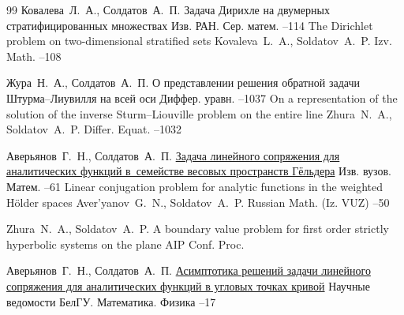 \begin{thebibliography}{99}
\by Ковалева~Л.~А., Солдатов~А.~П.
\paper Задача Дирихле на двумерных стратифицированных множествах
\jour Изв. РАН. Сер. матем.
--114
\transl
\paper The Dirichlet problem on two-dimensional stratified sets
\by \linebreak Kovaleva~L.~A., Soldatov~A.~P.
\jour Izv. Math.
--108

\by Жура~Н.~А., Солдатов~А.~П.
\paper О представлении решения обратной задачи Штурма–Лиувилля на всей оси
\jour Диффер. уравн.
--1037 
\transl
\paper On a representation of the solution of the inverse Sturm–Liouville problem on the entire line
\by Zhura~N.~A., Soldatov~A.~P.
\jour Differ. Equat.
--1032

\by Аверьянов~Г.~Н., Солдатов~А.~П.
\paper \href{http://mi.mathnet.ru/ivm9035}{Задача линейного сопряжения для аналитических функций в~семействе весовых пространств Гёльдера}
\jour Изв. вузов. Матем.
--61
\transl
\paper Linear conjugation problem for analytic functions in the weighted Hölder spaces
\by Aver'yanov~G.~N., Soldatov~A.~P.
\jour Russian Math. (Iz. VUZ)
--50

\by Zhura~N.~A., Soldatov~A.~P.
\paper A boundary value problem for first order strictly hyperbolic systems on the plane
\jour AIP Conf. Proc.

\by Аверьянов~Г.~Н., Солдатов~А.~П.
\paper \href{https://elibrary.ru/item.asp?id=24194784}{Асимптотика решений задачи линейного сопряжения для аналитических функций в угловых точках кривой}
\jour Научные ведомости БелГУ. Математика. Физика
--17


\end{thebibliography}

